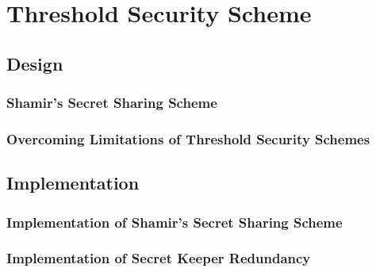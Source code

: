 \chapter{Threshold Security Scheme}\label{C:threshholdSecurity}

\section{Design}

\subsection{Shamir's Secret Sharing Scheme}

\subsection{Overcoming Limitations of Threshold Security Schemes}

\section{Implementation}

\subsection{Implementation of Shamir's Secret Sharing Scheme}

\subsection{Implementation of Secret Keeper Redundancy}